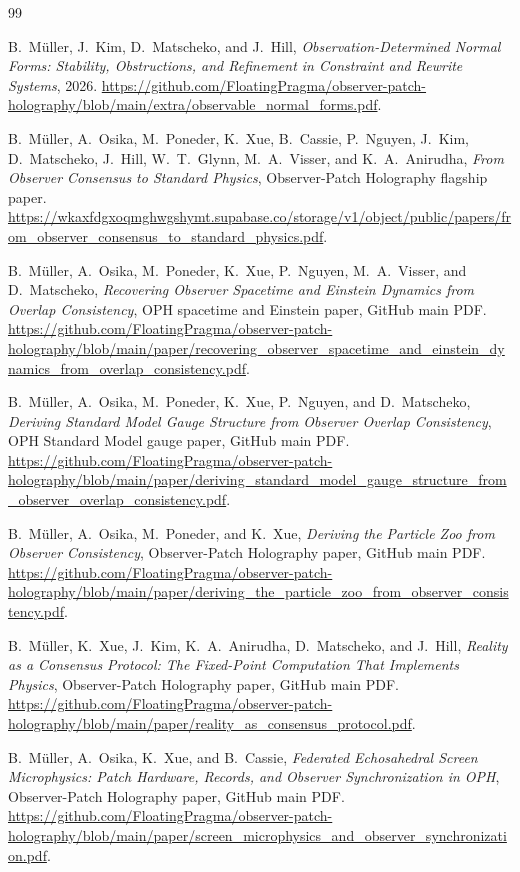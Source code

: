 \documentclass[11pt]{article}
\theoremstyle{remark}
\theoremstyle{plain}
\begin{document}
\begin{thebibliography}{99}

B.\ M\"uller, J.\ Kim, D.\ Matscheko, and J.\ Hill,
\emph{Observation-Determined Normal Forms: Stability, Obstructions, and Refinement in Constraint
and Rewrite Systems},
2026.
\url{https://github.com/FloatingPragma/observer-patch-holography/blob/main/extra/observable_normal_forms.pdf}.

B.\ M\"uller, A.\ Osika, M.\ Poneder, K.\ Xue, B.\ Cassie, P.\ Nguyen, J.\ Kim, D.\ Matscheko, J.\ Hill, W.\ T.\ Glynn, M.\ A.\ Visser, and K.\ A.\ Anirudha,
\emph{From Observer Consensus to Standard Physics},
Observer-Patch Holography flagship paper.
\url{https://wkaxfdgxoqmghwgshymt.supabase.co/storage/v1/object/public/papers/from_observer_consensus_to_standard_physics.pdf}.

B.\ M\"uller, A.\ Osika, M.\ Poneder, K.\ Xue, P.\ Nguyen, M.\ A.\ Visser, and D.\ Matscheko,
\emph{Recovering Observer Spacetime and Einstein Dynamics from Overlap Consistency},
OPH spacetime and Einstein paper, GitHub main PDF.
\url{https://github.com/FloatingPragma/observer-patch-holography/blob/main/paper/recovering_observer_spacetime_and_einstein_dynamics_from_overlap_consistency.pdf}.

B.\ M\"uller, A.\ Osika, M.\ Poneder, K.\ Xue, P.\ Nguyen, and D.\ Matscheko,
\emph{Deriving Standard Model Gauge Structure from Observer Overlap Consistency},
OPH Standard Model gauge paper, GitHub main PDF.
\url{https://github.com/FloatingPragma/observer-patch-holography/blob/main/paper/deriving_standard_model_gauge_structure_from_observer_overlap_consistency.pdf}.

B.\ M\"uller, A.\ Osika, M.\ Poneder, and K.\ Xue,
\emph{Deriving the Particle Zoo from Observer Consistency},
Observer-Patch Holography paper, GitHub main PDF.
\url{https://github.com/FloatingPragma/observer-patch-holography/blob/main/paper/deriving_the_particle_zoo_from_observer_consistency.pdf}.

B.\ M\"uller, K.\ Xue, J.\ Kim, K.\ A.\ Anirudha, D.\ Matscheko, and J.\ Hill,
\emph{Reality as a Consensus Protocol: The Fixed-Point Computation That Implements Physics},
Observer-Patch Holography paper, GitHub main PDF.
\url{https://github.com/FloatingPragma/observer-patch-holography/blob/main/paper/reality_as_consensus_protocol.pdf}.

B.\ M\"uller, A.\ Osika, K.\ Xue, and B.\ Cassie,
\emph{Federated Echosahedral Screen Microphysics: Patch Hardware, Records, and Observer Synchronization in OPH},
Observer-Patch Holography paper, GitHub main PDF.
\url{https://github.com/FloatingPragma/observer-patch-holography/blob/main/paper/screen_microphysics_and_observer_synchronization.pdf}.


\end{thebibliography}
\end{document}
